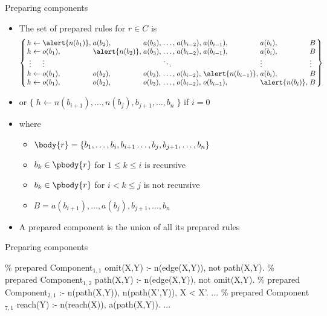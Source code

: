 \begin{frame}{Preparing components}

  \begin{itemize}
  \item The set of \alert{prepared rules} for \(r \in C\) is
    \[\arraycolsep=1.4pt
      \left\{
        \begin{array}{rcllllllll}
               h&\leftarrow&\alert{n(b_1)},&       a(b_2) ,&a(b_3),&\dots,&a(b_{i-2}),&       a(b_{i-1}) ,&       a(b_i), & B      \\
               h&\leftarrow&       o(b_1) ,&\alert{n(b_2)},&a(b_3),&\dots,&a(b_{i-2}),&       a(b_{i-1}) ,&       a(b_i), & B      \\
          \vdots&          &\vdots         &               &       &\ddots&           &                   &\vdots         & \vdots \\
               h&\leftarrow&       o(b_1) ,&       o(b_2) ,&o(b_3),&\dots,&o(b_{i-2}),&\alert{n(b_{i-1})},&       a(b_i), & B      \\
               h&\leftarrow&       o(b_1) ,&       o(b_2) ,&o(b_3),&\dots,&o(b_{i-2}),&       o(b_{i-1}) ,&\alert{n(b_i)},& B
        \end{array}
      \right\}
    \]
  \item [] or \quad \(\{\;h \leftarrow n(b_{i+1}), \dots, n(b_j), b_{j+1}, \dots, b_n\;\}\) \quad if \(i=0\)
  \item [] where
    \begin{itemize}
    \item \(\body{r} = \{ b_1, \dots, b_i, b_{i+1} \dots, b_j, b_{j+1}, \dots, b_n \}\)
    \item \(b_k\in\pbody{r}\) for \(1\leq k \leq i\) is recursive
    \item \(b_k\in\pbody{r}\) for \(i< k \leq j\) is not recursive
    \item \(B = a(b_{i+1}), \dots, a(b_j), b_{j+1}, \dots, b_n\)
    \end{itemize}
  \item<2-> A \alert{prepared component} is the union of all its prepared rules
  \end{itemize}
\end{frame}
\begin{frame}[fragile]{Preparing components}

\begin{SemiVerbatim}{.9}
{\color{comment}\% prepared Component\(_{1,1}\)}
omit(X,Y) :- \alert{n(edge(X,Y))}, not path(X,Y).
{\color{comment}\% prepared Component\(_{1,2}\)}
path(X,Y) :- \alert{n(edge(X,Y))}, not omit(X,Y).
{\color{comment}\% prepared Component\(_{2,1}\)}
:- \alert{n(path(X,Y))}, \alert{n(path(X',Y))}, X < X'.
...
{\color{comment}\% prepared Component\(_{7,1}\)}
reach(Y) :- \alert{n(reach(X))}, \alert{a(path(X,Y))}.
...
\end{SemiVerbatim}
\end{frame}
